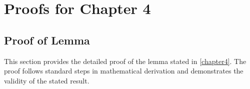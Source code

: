 \appendix
\chapter{Proofs for Chapter 4}
\label{appendix}

\section{Proof of Lemma}
\begin{paragraph}
This section provides the detailed proof of the lemma stated in \autoref{chapter4}. The proof follows standard steps in mathematical derivation and demonstrates the validity of the stated result.
\end{paragraph}
